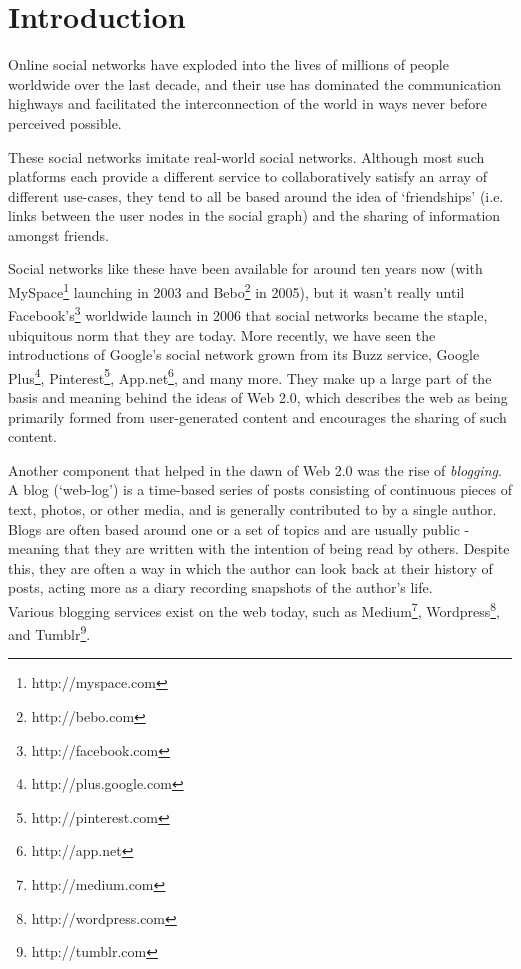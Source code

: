 \chapter{Introduction}

Online social networks have exploded into the lives of millions of people worldwide over the last decade, and their use has dominated the communication highways and facilitated the interconnection of the world in ways never before perceived possible.

These social networks imitate real-world social networks. Although most such platforms each provide a different service to collaboratively satisfy an array of different use-cases, they tend to all be based around the idea of `friendships' (i.e. links between the user nodes in the social graph) and the sharing of information amongst friends.

Social networks like these have been available for around ten years now (with MySpace\footnote{http://myspace.com} launching in 2003 and Bebo\footnote{http://bebo.com} in 2005), but it wasn't really until Facebook's\footnote{http://facebook.com} worldwide launch in 2006 that social networks became the staple, ubiquitous norm that they are today. More recently, we have seen the introductions of Google's social network grown from its Buzz service, Google Plus\footnote{http://plus.google.com}, Pinterest\footnote{http://pinterest.com}, App.net\footnote{http://app.net}, and many more. They make up a large part of the basis and meaning behind the ideas of Web 2.0, which describes the web as being primarily formed from user-generated content and encourages the sharing of such content.

Another component that helped in the dawn of Web 2.0 was the rise of \textit{blogging}. A blog (`web-log') is a time-based series of posts consisting of continuous pieces of text, photos, or other media, and is generally contributed to by a single author. Blogs are often based around one or a set of topics and are usually public - meaning that they are written with the intention of being read by others. Despite this, they are often a way in which the author can look back at their history of posts, acting more as a diary recording snapshots of the author's life.\\
Various blogging services exist on the web today, such as Medium\footnote{http://medium.com}, Wordpress\footnote{http://wordpress.com}, and Tumblr\footnote{http://tumblr.com}.


